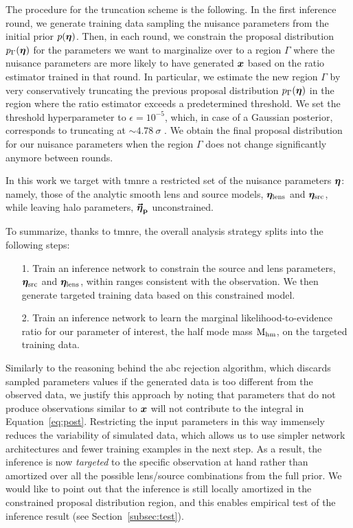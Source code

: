The procedure for the truncation scheme is the following. In the first inference round, we generate training data sampling the nuisance parameters from the initial prior $p(\bm{\eta})$. Then, in each round, we constrain the proposal distribution $p_\Gamma(\bm{\eta})$ for the parameters we want to marginalize over to a region $\Gamma$ where the nuisance parameters are more likely to have generated $\bm{x}$ based on the ratio estimator trained in that round. In particular, we estimate the new region $\Gamma$ by very conservatively truncating the previous proposal distribution $p_\Gamma(\bm{\eta})$ in the region where the ratio estimator exceeds a predetermined threshold. We set the threshold hyperparameter to $\epsilon = 10^{-5}$, which, in case of a Gaussian posterior, corresponds to truncating at $\sim 4.78\ \sigma$ \cite{Miller:2022shs}. We obtain the final proposal distribution for our nuisance parameters when the region $\Gamma$ does not change significantly anymore between rounds. 


\medskip
In this work we target with \gls*{tmnre} a restricted set of the nuisance parameters $\bm{\eta}$: namely, those of the analytic smooth lens and source models, $\bm{\eta}_\mathrm{lens}$ and $\bm{\eta}_\mathrm{src}$, while leaving halo parameters, $\boldsymbol{\vec{{\bm{\eta}}}_\mathrm{p}}$ unconstrained.

\medskip
To summarize, thanks to \gls*{tmnre}, the overall analysis strategy splits into the following steps:
\begin{enumerate}[leftmargin=1cm]
    \item[{1.}] Train an inference network to constrain the source and lens parameters, $\bm{\eta}_\mathrm{src}$ and $\bm{\eta}_\mathrm{lens}$, within ranges consistent with the observation. We then generate targeted training data based on this constrained model.
    \item[{2.}] Train an inference network to learn the marginal likelihood-to-evidence ratio for our parameter of interest, the half mode mass $\mathrm{M_{hm}}$, on the targeted training data.
\end{enumerate}

Similarly to the reasoning behind the \gls*{abc} rejection algorithm, which discards sampled parameters values if the generated data is too different from the observed data, we justify this approach by noting that parameters that do not produce observations similar to $\bm{x}$ will not contribute to the integral in Equation~\eqref{eq:post}. Restricting the input parameters in this way immensely reduces the variability of simulated data, which allows us to use simpler network architectures and fewer training examples in the next step. As a result, the inference is now \emph{targeted} to the specific observation at hand rather than amortized over all the possible lens/source combinations from the full prior. We would like to point out that the inference is still locally amortized in the constrained proposal distribution region, and this enables empirical test of the inference result (see Section~\ref{subsec:test}).



